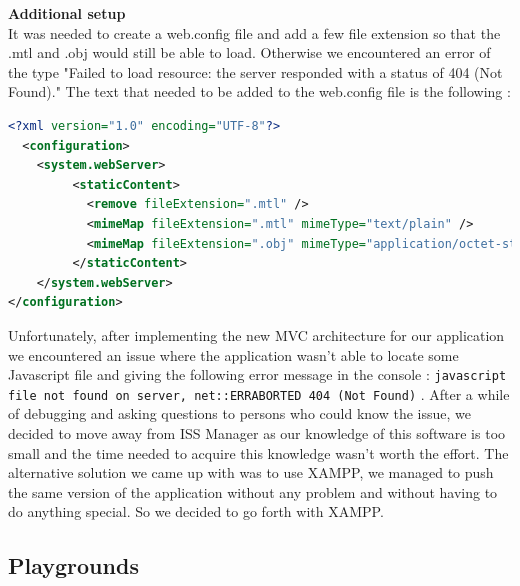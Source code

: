 \documentclass{scrartcl}
\begin{document}
\textbf{Additional setup}\\

It was needed to create a web.config file and add a few file extension so that the .mtl and .obj would still be able to load. 
Otherwise we encountered an error of the type "Failed to load resource: the server responded with a status of 404 (Not Found)." 
The text that needed to be added to the web.config file is the following : \\
\begin{lstlisting}[language=XML, basicstyle=\ttfamily\small]
<?xml version="1.0" encoding="UTF-8"?>
  <configuration>
    <system.webServer>
         <staticContent>
           <remove fileExtension=".mtl" />
           <mimeMap fileExtension=".mtl" mimeType="text/plain" />
           <mimeMap fileExtension=".obj" mimeType="application/octet-stream" />
         </staticContent>
    </system.webServer>
</configuration>
\end{lstlisting}

Unfortunately, after implementing the new MVC architecture for our application we encountered an issue where the application wasn't able to locate some Javascript file and giving the following error message in the console : 
\texttt{javascript file not found on server, net::ERR\textunderscore ABORTED 404 (Not Found)} .  After a while of debugging and asking questions to persons who could know the issue, 
we decided to move away from ISS Manager as our knowledge of this software is too small and the time needed to acquire this knowledge wasn't worth the effort. 
The alternative solution we came up with was to use XAMPP, we managed to push the same version of the application without any problem and without having to do anything special. So we decided to go forth with XAMPP.

\subsection{Playgrounds}
\end{document}
